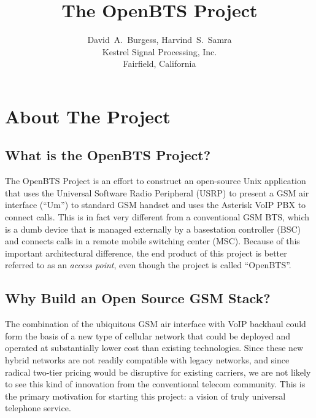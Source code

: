 \documentclass[11pt]{book}
\title{The OpenBTS Project}
\author{David~A.~Burgess, Harvind~S.~Samra \\
Kestrel Signal Processing, Inc.\\
Fairfield, California}
\begin{document}
\maketitle




\chapter{About The Project}

\section{What is the OpenBTS Project?}
The OpenBTS Project is an effort to construct an open-source Unix application that uses the Universal Software Radio Peripheral (USRP) to present a GSM air interface (``Um'') to standard GSM handset and uses the Asterisk VoIP PBX to connect calls. This is in fact very different from a conventional GSM BTS, which is a dumb device that is managed externally by a basestation controller (BSC) and connects calls in a remote mobile switching center (MSC). Because of this important architectural difference, the end product of this project is better referred to as an \emph{access point}, even though the project is called ``OpenBTS''.

\section{Why Build an Open Source GSM Stack?}
The combination of the ubiquitous GSM air interface with VoIP backhaul could form the basis of a new type of cellular network that could be deployed and operated at substantially lower cost than existing technologies. Since these new hybrid networks are not readily compatible with legacy networks, and since radical two-tier pricing would be disruptive for existing carriers, we are not likely to see this kind of innovation from the conventional telecom community. This is the primary motivation for starting this project: a vision of truly universal telephone service.
\end{document}
